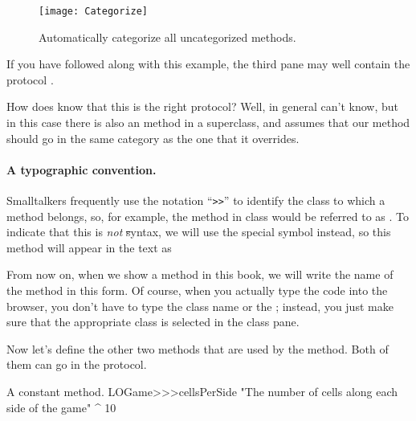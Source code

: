 \documentclass[a4paper,10pt,twoside]{book}
\begin{document}
\begin{figure}[htbp]
   \centering
   \texttt{[image: Categorize]} 
   \caption{Automatically categorize all uncategorized methods.}
\end{figure}

If you have followed along with this example, the third pane may well contain the protocol .

How does \pharo{} know that this is the right protocol?  Well, in general \pharo{} can't know, but in this case there is also an  method in a superclass, and \pharo assumes that our  method should go in the same category as the one that it overrides.


\paragraph{A typographic convention.} Smalltalkers frequently use the notation ``\verb|>>|'' to identify the class to which a method belongs, so, for example, the  method in class  would be referred to as .
To indicate that this is \emph{not} \st syntax, we will use the special symbol \ct{>>>} instead, so this method will appear in the text as 

From now on, when we show a method in this book, we will write the name of the method in this form.  Of course, when you actually type the code into the browser, you don't have to type the class name or the \ct{>>>}; instead, you just make sure that the appropriate class is selected in the class pane.  

Now let's define the other two methods that are used by the  method. Both of them can go in the  protocol.

\begin{method}[sbegamecellsperside]{A constant method.}
LOGame>>>cellsPerSide
   "The number of cells along each side of the game"
   ^ 10
\end{method}
\end{document}
